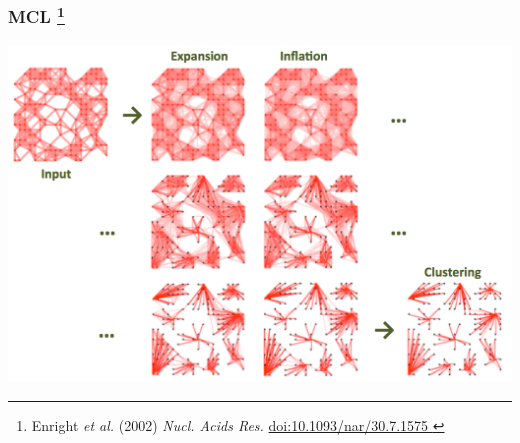 % 
\begin{frame}
  \frametitle{MCL
    \footnote{\tiny{Enright \textit{et al.} (2002) \textit{Nucl. Acids Res.} \href{http://dx.doi.org/10.1093/nar/30.7.1575}{doi:10.1093/nar/30.7.1575
    }}}
  }  
  \begin{center}
      \includegraphics[width=1\textwidth]{images/mcl_method}
  \end{center}
\end{frame}

